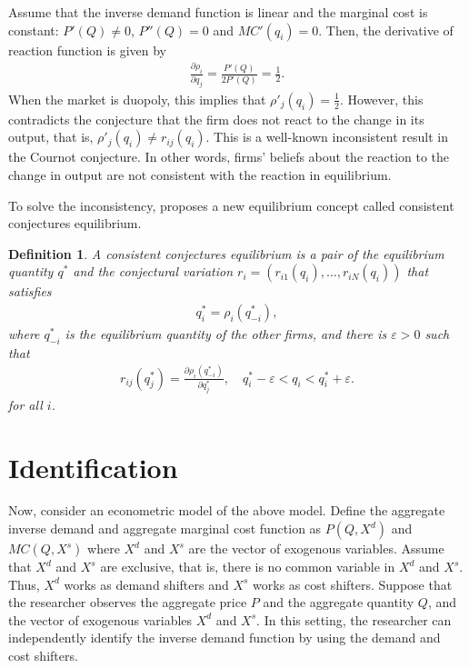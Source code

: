 \documentclass[11pt, a4paper]{article}
\newtheorem{definition}{Definition}
\theoremstyle{remark}
\begin{document}
Assume that the inverse demand function is linear and the marginal cost is constant: 
$P'(Q) \ne 0$, $P''(Q) = 0$ and $MC'(q_i) = 0$.
Then, the derivative of reaction function is given by
\begin{align}
    \frac{\partial \rho_i}{\partial q_j} = \frac{P'(Q)}{2P'(Q)} = \frac{1}{2}.
\end{align}
When the market is duopoly, this implies that $\rho'_{j}(q_i) = \frac{1}{2}$.
However, this contradicts the conjecture that the firm does not react to the change in its output, that is, $\rho'_{j}(q_i) \ne r_{ij}(q_i)$.
This is a well-known inconsistent result in the Cournot conjecture.
In other words, firms' beliefs about the reaction to the change in output are not consistent with the reaction in equilibrium.

To solve the inconsistency, proposes a new equilibrium concept called consistent conjectures equilibrium.


\begin{framed}
    \begin{definition}
        A consistent conjectures equilibrium is a pair of the equilibrium quantity $q^*$ and the conjectural variation $r_i = (r_{i1}(q_i), \ldots, r_{iN}(q_i))$ that satisfies 
        \begin{align}
            q^*_i = \rho_i(q_{-i}^*),
        \end{align}
        where $q_{-i}^*$ is the equilibrium quantity of the other firms, and there is $\varepsilon > 0$ such that
        \begin{align}
            r_{ij}(q_j^*) = \frac{\partial \rho_{i}(q_{-i}^*)}{\partial q_j^*},\quad q^*_{i} - \varepsilon < q_i < q^*_{i} + \varepsilon.
        \end{align}
        for all $i$.
    \end{definition}
\end{framed}





















\section{Identification}
Now, consider an econometric model of the above model.
Define the aggregate inverse demand and aggregate marginal cost function as $P(Q, X^{d})$ and $MC(Q, X^{s})$ where $X^{d}$ and $X^{s}$ are the vector of exogenous variables.
Assume that $X^{d}$ and $X^{s}$ are exclusive, that is, there is no common variable in $X^{d}$ and $X^{s}$.
Thus, $X^{d}$ works as demand shifters and $X^{s}$ works as cost shifters. 
Suppose that the researcher observes the aggregate price $P$ and the aggregate quantity $Q$, and the vector of exogenous variables $X^{d}$ and $X^{s}$.
In this setting, the researcher can independently identify the inverse demand function by using the demand and cost shifters.
\end{document}
